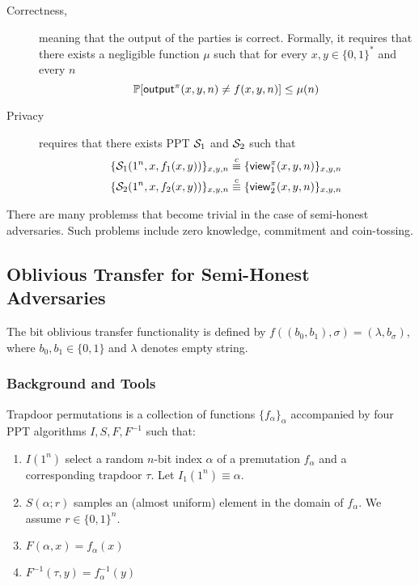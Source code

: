 \begin{description}
\item[Correctness,] meaning that the output of the parties is correct. Formally, it requires that there exists a negligible function $\mu$ such that for every $x,y\in\{0,1\}^*$ and every $n$
    $$\mathop{\mathbb P\/}[{\sf output}^\pi(x,y,n)\neq f(x,y,n)]\leq\mu(n)$$
\item[Privacy] requires that there exists PPT $\mathcal{S}_1$ and $\mathcal{S}_2$ such that
\begin{align*}
    \{\mathcal{S}_1(1^n,x,f_1(x,y))\}_{x,y,n} \stackrel{c}{\equiv} \{{\sf view}^\pi_1(x,y,n)\}_{x,y,n} \\
    \{\mathcal{S}_2(1^n,x,f_2(x,y))\}_{x,y,n} \stackrel{c}{\equiv} \{{\sf view}^\pi_2(x,y,n)\}_{x,y,n} \\
\end{align*}
\end{description}
\begin{remark} There are many problemss that become trivial in the case of semi-honest adversaries. Such problems include zero knowledge, commitment and coin-tossing.
\end{remark}
\subsection{Oblivious Transfer for Semi-Honest Adversaries}
The bit oblivious transfer functionality is defined by $f((b_0,b_1), \sigma )=(\lambda,b_\sigma)$, where $b_0,b_1\in\{0,1\}$ and $\lambda$ denotes empty string.
\subsubsection{Background and Tools}
\begin{definition}
Trapdoor permutations is a collection of functions $\{f_\alpha\}_\alpha$ accompanied by four PPT algorithms $I,S,F,F^{-1}$ such that:
\begin{enumerate}
\item $I(1^n)$ select a random $n$-bit index $\alpha$ of a premutation $f_\alpha$ and a corresponding trapdoor $\tau$. Let $I_1(1^n)\equiv\alpha$.
\item $S(\alpha;r)$ samples an (almost uniform) element in the domain of $f_\alpha$. We assume $r\in\{0,1\}^n$.
\item $F(\alpha,x)=f_\alpha(x)$
\item $F^{-1}(\tau,y)=f^{-1}_\alpha(y)$
\end{enumerate}
\end{definition}

